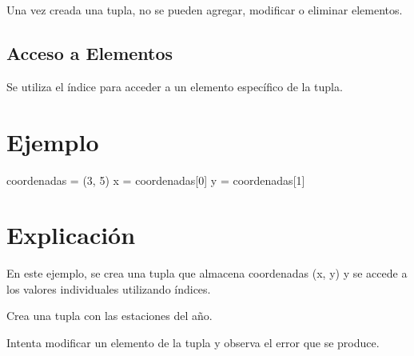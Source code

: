 \documentclass[
  a4paper,
  DIV=11,
  numbers=noendperiod,
  onepage,
  openany]{scrreprt}
\newenvironment{Shaded}{\begin{snugshade}}{\end{snugshade}}
\newcommand{\DecValTok}[1]{\textcolor[rgb]{0.68,0.00,0.00}{#1}}
\newcommand{\NormalTok}[1]{\textcolor[rgb]{0.00,0.23,0.31}{#1}}
\newcommand{\OperatorTok}[1]{\textcolor[rgb]{0.37,0.37,0.37}{#1}}
\begin{document}
Una vez creada una tupla, no se pueden agregar, modificar o eliminar
elementos.

\hypertarget{acceso-a-elementos-3}{%
\subsection{Acceso a Elementos}\label{acceso-a-elementos-3}}

Se utiliza el índice para acceder a un elemento específico de la tupla.

\hypertarget{ejemplo-21}{%
\section{Ejemplo}\label{ejemplo-21}}

\begin{Shaded}
\begin{Highlighting}[]
\NormalTok{coordenadas }\OperatorTok{=}\NormalTok{ (}\DecValTok{3}\NormalTok{, }\DecValTok{5}\NormalTok{)}
\NormalTok{x }\OperatorTok{=}\NormalTok{ coordenadas[}\DecValTok{0}\NormalTok{]}
\NormalTok{y }\OperatorTok{=}\NormalTok{ coordenadas[}\DecValTok{1}\NormalTok{]}
\end{Highlighting}
\end{Shaded}

\hypertarget{explicaciuxf3n-21}{%
\section{Explicación}\label{explicaciuxf3n-21}}

En este ejemplo, se crea una tupla que almacena coordenadas (x, y) y se
accede a los valores individuales utilizando índices.

\begin{tcolorbox}[enhanced jigsaw, colbacktitle=quarto-callout-important-color!10!white, toprule=.15mm, leftrule=.75mm, titlerule=0mm, opacityback=0, rightrule=.15mm, opacitybacktitle=0.6, breakable, left=2mm, coltitle=black, title=\textcolor{quarto-callout-important-color}{\faExclamation}\hspace{0.5em}{Actividad Práctica:}, toptitle=1mm, bottomtitle=1mm, arc=.35mm, bottomrule=.15mm, colback=white, colframe=quarto-callout-important-color-frame]

Crea una tupla con las estaciones del año.

Intenta modificar un elemento de la tupla y observa el error que se
produce.

\end{tcolorbox}
\end{document}
